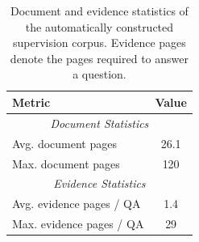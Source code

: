 \documentclass[letterpaper]{article} %
\begin{document}
\begin{table}[h]
\centering

\begin{tabular}{lc}
\toprule
\textbf{Metric} & \textbf{Value} \\
\midrule
\multicolumn{2}{c}{\textit{Document Statistics}}\\
\midrule
Avg. document pages & 26.1 \\
Max. document pages & 120 \\
\midrule
\multicolumn{2}{c}{\textit{Evidence Statistics}}\\
\midrule
Avg. evidence pages / QA & 1.4 \\
Max. evidence pages / QA & 29 \\
\bottomrule
\end{tabular}

\caption{
Document and evidence statistics of the automatically constructed supervision corpus.
Evidence pages denote the pages required to answer a question.
}
\label{tab:doc_statistics}

\end{table}
\end{document}
